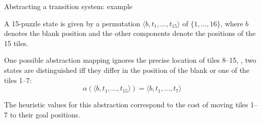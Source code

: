 \documentclass{gkibeamer}
\begin{document}
\begin{frame}{Abstracting a transition system: example}
  \begin{example}[15-puzzle]
    A \alert{15-puzzle} state is given by a permutation
    $\langle b, t_1, \dots, t_{15}\rangle$ of $\{1, \dots, 16\}$,
    where $b$ denotes the blank position and the other components
    denote the positions of the 15 tiles.

    \smallskip

    One possible \alert{abstraction mapping} ignores the precise
    location of tiles 8--15, \ie, two states are distinguished iff
    they differ in the position of the blank or one of the tiles 1--7:
    \[\alpha(\langle b, t_1, \dots, t_{15}\rangle) =
      \langle b, t_1, \dots, t_7\rangle\]

    \medskip

    The heuristic values for this abstraction correspond to the cost
    of moving tiles 1--7 to their goal positions.
  \end{example}
\end{frame}
\end{document}
